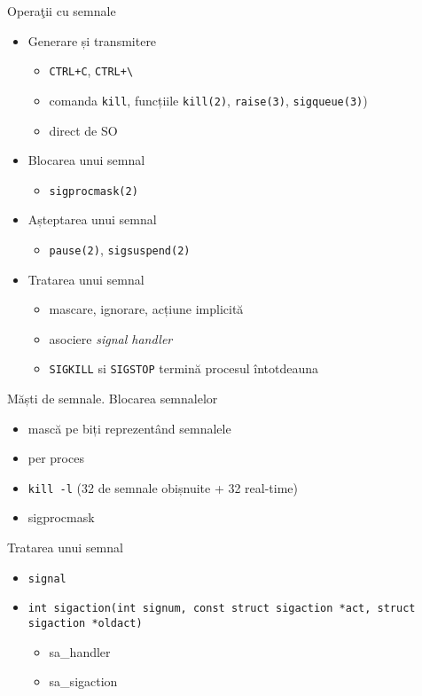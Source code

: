 \documentclass{so.cs.pub.ro}
\begin{document}
\begin{frame}{Operaţii cu semnale}
	\begin{itemize}    %
		\item Generare și transmitere
			\begin{itemize}
				\item \texttt{CTRL+C}, \texttt{CTRL+\textbackslash}
				\item comanda \texttt{kill}, funcțiile \texttt{kill(2)}, \texttt{raise(3)}, \texttt{sigqueue(3)})
				\item direct de SO
			\end{itemize}
		\item Blocarea unui semnal
			\begin{itemize}
				\item \texttt{sigprocmask(2)}
			\end{itemize}
		\item Așteptarea unui semnal
			\begin{itemize}
				\item \texttt{pause(2)}, \texttt{sigsuspend(2)}
			\end{itemize}
		\item Tratarea unui semnal
			\begin{itemize}
				\item mascare, ignorare, acțiune implicită
				\item asociere \emph{signal handler}
				\item \texttt{SIGKILL} si \texttt{SIGSTOP} termină procesul întotdeauna
			\end{itemize}
	\end{itemize}
\end{frame}

\begin{frame}{Măști de semnale. Blocarea semnalelor}
	\begin{itemize}    %
		\item mască pe biți reprezentând semnalele
		\item per proces
		\item \texttt{kill -l} (32 de semnale obișnuite + 32 real-time)
		\item sigprocmask
	\end{itemize}
\end{frame}

\begin{frame}{Tratarea unui semnal}
	\begin{itemize}    %
		\item \texttt{signal}
		\item \texttt{int sigaction(int signum, const struct sigaction *act, struct sigaction *oldact)}
			\begin{itemize}
			\item sa_handler
			\item sa_sigaction
			\end{itemize}
	\end{itemize}
\end{frame}
\end{document}
